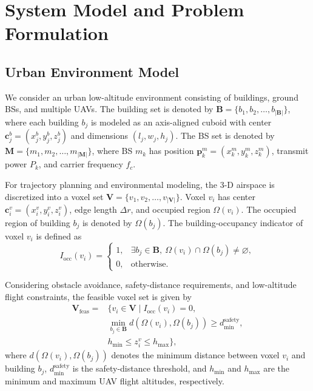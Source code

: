 \documentclass[lettersize,journal]{IEEEtran}
\begin{document}
\section{System Model and Problem Formulation} 

\subsection{Urban Environment Model}

We consider an urban low-altitude environment consisting of buildings, ground BSs, and multiple UAVs. The building set is denoted by $\mathbf{B}=\{b_1,b_2,\ldots,b_{|\mathbf{B}|}\}$, where each building $b_j$ is modeled as an axis-aligned cuboid with center $\mathbf{c}_j^b=(x_j^b,y_j^b,z_j^b)$ and dimensions $(l_j,w_j,h_j)$. The BS set is denoted by $\mathbf{M}=\{m_1,m_2,\ldots,m_{|\mathbf{M}|}\}$, where BS $m_k$ has position $\mathbf{p}_k^m=(x_k^m,y_k^m,z_k^m)$, transmit power $P_k$, and carrier frequency $f_c$.

For trajectory planning and environmental modeling, the 3-D airspace is discretized into a voxel set $\mathbf{V}=\{v_1,v_2,\ldots,v_{|\mathbf{V}|}\}$. Voxel $v_i$ has center $\mathbf{c}_i^v=(x_i^v,y_i^v,z_i^v)$, edge length $\Delta r$, and occupied region $\Omega(v_i)$. The occupied region of building $b_j$ is denoted by $\Omega(b_j)$. The building-occupancy indicator of voxel $v_i$ is defined as
\begin{equation}
I_{\mathrm{occ}}(v_i)=
\begin{cases}
1, & \exists b_j\in\mathbf{B},\ \Omega(v_i)\cap\Omega(b_j)\neq\varnothing,\\
0, & \mathrm{otherwise}.
\end{cases}
\end{equation}

Considering obstacle avoidance, safety-distance requirements, and low-altitude flight constraints, the feasible voxel set is given by
\begin{equation}
\begin{aligned}
\mathbf{V}_{\mathrm{feas}}=&\{v_i\in\mathbf{V}\mid I_{\mathrm{occ}}(v_i)=0,\\
&\min_{b_j\in\mathbf{B}}d(\Omega(v_i),\Omega(b_j))\ge d_{\min}^{\mathrm{safety}},\\
& h_{\min}\le z_i^v\le h_{\max}\},
\end{aligned}
\end{equation}
where $d(\Omega(v_i),\Omega(b_j))$ denotes the minimum distance between voxel $v_i$ and building $b_j$, $d_{\min}^{\mathrm{safety}}$ is the safety-distance threshold, and $h_{\min}$ and $h_{\max}$ are the minimum and maximum UAV flight altitudes, respectively.
\end{document}
